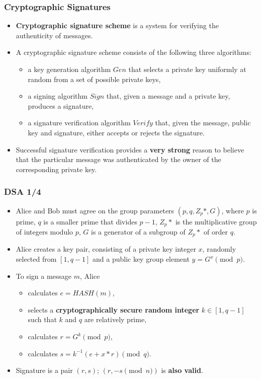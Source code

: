 \documentclass{beamer}
\begin{document}
\begin{frame}
  \frametitle{Cryptographic Signatures}
  \begin{itemize}
  \item \textbf{Cryptographic signature scheme} is a system for verifying the
    authenticity of messages.
  \item A cryptographic signature scheme consists of the following three
    algorithms:
    \begin{itemize}
    \item a key generation algorithm $Gen$ that selects a private key uniformly
      at random from a set of possible private keys,
    \item a signing algorithm $Sign$ that, given a message and a private key,
      produces a signature,
    \item a signature verification algorithm $Verify$ that, given the message,
      public key and signature, either accepts or rejects the signature.
    \end{itemize}
  \item Successful signature verification provides a \textbf{very strong} reason
    to believe that the particular message was authenticated by the owner of the
    corresponding private key.
  \end{itemize}
\end{frame}

\begin{frame}
  \frametitle{DSA 1/4}
  \begin{itemize}
  \item Alice and Bob must agree on the group parameters $(p, q, Z_p*, G)$, where
    $p$ is prime, $q$ is a smaller prime that divides $p-1$, $Z_p*$ is the multiplicative group of integers modulo $p$,
    $G$ is a generator of a subgroup of $Z_p*$ of order $q$.
  \item Alice creates a key pair, consisting of a private key integer $x$,
    randomly selected from $[1, q - 1]$ and a public key group
    element $y = G^x \pmod{p}$.
  \item To sign a message $m$, Alice
    \begin{itemize}
    \item calculates $e = HASH(m)$,
    \item selects a \textbf{cryptographically secure random integer}
      $k \in [1, q - 1]$ such that $k$ and $q$ are relatively prime,
    \item calculates $r = G^k \pmod{p}$,
    \item calculates $s = k^{-1}(e + x*r) \pmod{q}$.
    \end{itemize}
  \item Signature is a pair $(r, s)$; $(r, -s \pmod{n})$ is \textbf{also valid}.
  \end{itemize}
\end{frame}
\end{document}
